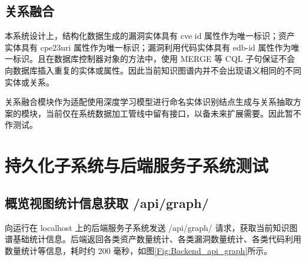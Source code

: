 \documentclass[a4paper,AutoFakeBold,oneside,12pt]{book}
\begin{document}

\subsection{关系融合}

本系统设计上，结构化数据生成的漏洞实体具有 cve id 属性作为唯一标识；资产实体具有 cpe23uri 属性作为唯一标识；漏洞利用代码实体具有 edb-id 属性作为唯一标识。且在数据库控制器对象的方法中，使用 MERGE 等 CQL 子句保证不会向数据库插入重复的实体或属性。因此当前知识图谱内并不会出现语义相同的不同实体或关系。

关系融合模块作为适配使用深度学习模型进行命名实体识别结点生成与关系抽取方案的模块，当前仅在系统数据加工管线中留有接口，以备未来扩展需要。因此暂不作测试。

\section{持久化子系统与后端服务子系统测试}

\subsection{概览视图统计信息获取 /api/graph/}

向运行在 localhost 上的后端服务子系统发送 /api/graph/ 请求，获取当前知识图谱基础统计信息。后端返回各类资产数量统计、各类漏洞数量统计、各类代码利用数量统计等信息，耗时约 200 毫秒，如图\ref{Fig:Backend_api_graph}所示。


\end{document}
